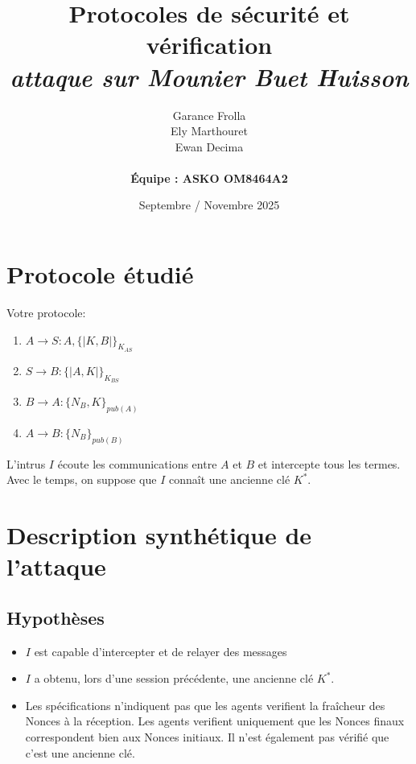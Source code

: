 \documentclass[11pt]{article}
\begin{document}
\title{\textbf{Protocoles de sécurité et vérification} \\
{\small \textit{attaque sur Mounier Buet Huisson}}}

\author{Garance Frolla \\ Ely Marthouret \\ Ewan Decima \\\\ \textbf{Équipe : ASKO OM8464A2}}
\date{Septembre / Novembre 2025}

\maketitle
\tableofcontents
\newpage

\section{Protocole étudié}

Votre protocole:

\begin{enumerate}
    \item $A \rightarrow S : A, \{|K,B|\}_{K_{AS}}$
    \item $S \rightarrow B : \{|A,K|\}_{K_{BS}}$
    \item $B \rightarrow A : \{N_B,K\}_{pub(A)}$
    \item $A \rightarrow B :  \{N_B\}_{pub(B)}$
\end{enumerate}

\bigskip
\noindent
L'intrus $I$ écoute les communications entre $A$ et $B$ et intercepte tous les termes. Avec le temps, on suppose que $I$ connaît une ancienne clé $K^*$.

\section{Description synthétique de l'attaque}

\subsection{Hypothèses}
\begin{itemize}
    \item $I$ est capable d'intercepter et de relayer des messages 
    \item $I$ a obtenu, lors d'une session précédente, une ancienne clé $K^*$.
    \item Les spécifications n'indiquent pas que les agents verifient la fraîcheur des Nonces à la réception. Les agents verifient uniquement que les Nonces finaux correspondent bien aux Nonces initiaux. Il n'est également pas vérifié que c'est une ancienne clé.

    

\end{itemize}
\end{document}
